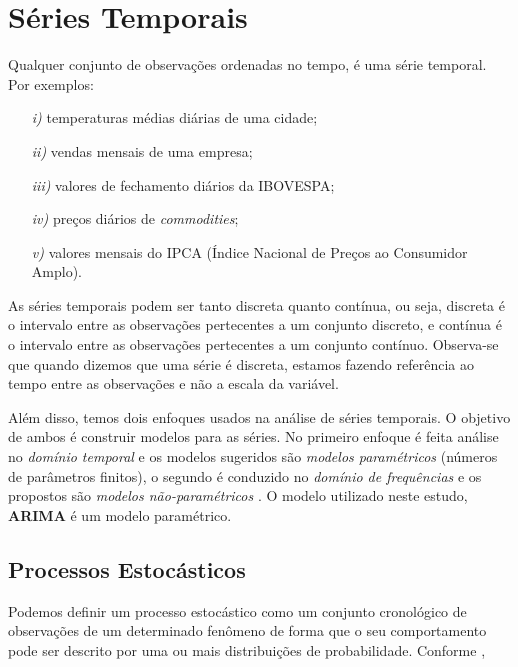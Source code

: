 \documentclass[
	12pt,				%
	openright,			%
	oneside,      %
	a4paper,			%
	english,			%
	french,				%
	spanish,			%
	brazil,				%
	]{abntex2}\usepackage[]{graphicx}\usepackage[table]{xcolor}
\theoremstyle{definition}
\theoremstyle{remark}
\begin{document}
\chapter{Séries Temporais}
  
Qualquer conjunto de observações ordenadas no tempo, é uma série temporal. Por exemplos:

\begin{itemize}
  \item[\textit{i)}] temperaturas médias diárias de uma cidade;
  \item[\textit{ii)}] vendas mensais de uma empresa;
  \item[\textit{iii)}] valores de fechamento diários da IBOVESPA;
  \item[\textit{iv)}] preços diários de \textit{commodities};
  \item[\textit{v)}] valores mensais do IPCA (Índice Nacional de Preços ao Consumidor Amplo).
\end{itemize}

As séries temporais podem ser tanto discreta quanto contínua, ou seja, discreta é o 
intervalo entre as observações pertecentes a um conjunto discreto, e contínua é o 
intervalo entre as observações pertecentes a um conjunto contínuo. Observa-se que 
quando dizemos que uma série é discreta, estamos fazendo referência ao tempo entre as 
observações e não a escala da variável.

Além disso, temos dois enfoques usados na análise de séries temporais. O objetivo de ambos é construir modelos para as séries. No primeiro enfoque é feita análise no \textit{domínio temporal} e os modelos sugeridos são \textit{modelos paramétricos} (números de parâmetros finitos), o segundo é conduzido no \textit{domínio de frequências} e os propostos são 
\textit{modelos não-paramétricos} \cite{morettin2006analise}. O modelo utilizado neste 
estudo, \textbf{ARIMA} é um modelo paramétrico.




  \section{Processos Estocásticos}
  
Podemos definir um processo estocástico como um conjunto cronológico de observações de um determinado fenômeno de forma que o seu comportamento pode ser descrito por uma ou mais distribuições de probabilidade. Conforme \cite{morettin2006analise},
\end{document}
